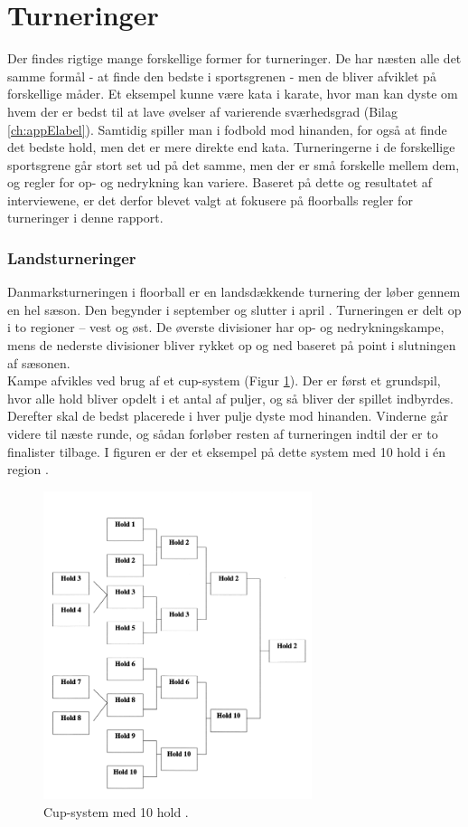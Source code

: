 \section{Turneringer}
Der findes rigtige mange forskellige former for turneringer. De har næsten alle det samme formål - at finde den bedste i sportsgrenen - men de bliver afviklet på forskellige måder. Et eksempel kunne være kata i karate, hvor man kan dyste om hvem der er bedst til at lave øvelser af varierende sværhedsgrad (Bilag \ref{ch:appElabel}). Samtidig spiller man i fodbold mod hinanden, for også at finde det bedste hold, men det er mere direkte end kata. Turneringerne i de forskellige sportsgrene går stort set ud på det samme, men der er små forskelle mellem dem, og regler for op- og nedrykning kan variere. Baseret på dette og resultatet af interviewene, er det derfor blevet valgt at fokusere på floorballs regler for turneringer i denne rapport.

\subsubsection{Landsturneringer}
Danmarksturneringen i floorball er en landsdækkende turnering der løber gennem en hel sæson. Den begynder i september og slutter i april \cite{Landsturnering}. Turneringen er delt op i to regioner – vest og øst. De øverste divisioner har op- og nedrykningskampe, mens de nederste divisioner bliver rykket op og ned baseret på point i slutningen af sæsonen.\\
Kampe afvikles ved brug af et cup-system (Figur \ref{fig:cup-spil}). Der er først et grundspil, hvor alle hold bliver opdelt i et antal af puljer, og så bliver der spillet indbyrdes. Derefter skal de bedst placerede i hver pulje dyste mod hinanden. Vinderne går videre til næste runde, og sådan forløber resten af turneringen indtil der er to finalister tilbage. I figuren er der et eksempel på dette system med 10 hold i én region \cite{Unihoc}\cite{Landsturnering}.

\begin{figure}[H]
  \centering
  \includegraphics[width=0.7\textwidth]{figures/cup-spil.png}
  \caption{Cup-system med 10 hold 
  \citep{staevnemappe}. }
  \label{fig:cup-spil}
\end{figure}

